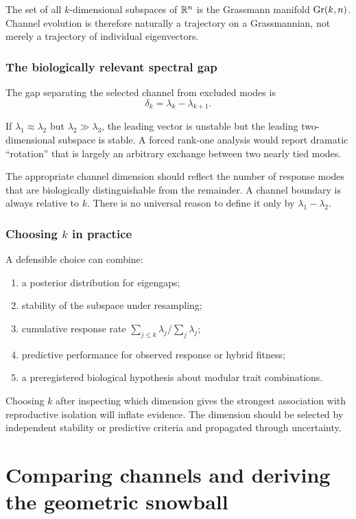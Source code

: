 \begin{mathteach}
The set of all \(k\)-dimensional subspaces of \(\mathbb R^n\) is the Grassmann manifold \(\operatorname{Gr}(k,n)\). Channel evolution is therefore naturally a trajectory on a Grassmannian, not merely a trajectory of individual eigenvectors.
\end{mathteach}

\section{The biologically relevant spectral gap}

The gap separating the selected channel from excluded modes is
\begin{equation}
\delta_k=\lambda_k-\lambda_{k+1}.
\label{eq:kGap}
\end{equation}

If \(\lambda_1\approx\lambda_2\) but \(\lambda_2\gg\lambda_3\), the leading vector is unstable but the leading two-dimensional subspace is stable. A forced rank-one analysis would report dramatic ``rotation'' that is largely an arbitrary exchange between two nearly tied modes.

\begin{biobox}
The appropriate channel dimension should reflect the number of response modes that are biologically distinguishable from the remainder. A channel boundary is always relative to \(k\). There is no universal reason to define it only by \(\lambda_1-\lambda_2\).
\end{biobox}

\section{Choosing \(k\) in practice}

A defensible choice can combine:
\begin{enumerate}[leftmargin=1.6em]
\item a posterior distribution for eigengaps;
\item stability of the subspace under resampling;
\item cumulative response rate \(\sum_{j\le k}\lambda_j/\sum_j\lambda_j\);
\item predictive performance for observed response or hybrid fitness;
\item a preregistered biological hypothesis about modular trait combinations.
\end{enumerate}

\begin{cautionbox}
Choosing \(k\) after inspecting which dimension gives the strongest association with reproductive isolation will inflate evidence. The dimension should be selected by independent stability or predictive criteria and propagated through uncertainty.
\end{cautionbox}

\part{Comparing channels and deriving the geometric snowball}
